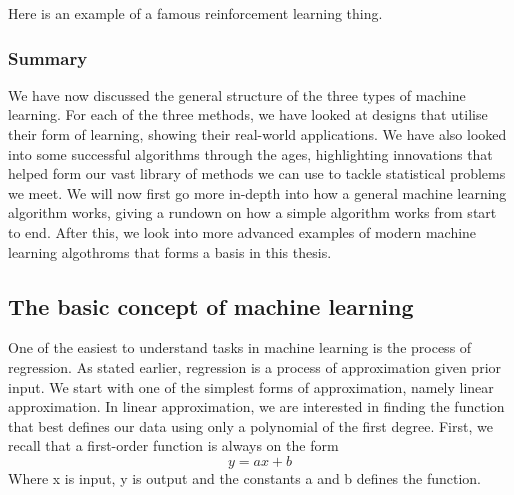 \vspace{5px}

Here is an example of a famous reinforcement learning thing.


\subsubsection{Summary} 

We have now discussed the general structure of the three types of machine learning. For each of the three methods, we have looked at designs that utilise their form of learning, showing their real-world applications.
We have also looked into some successful algorithms through the ages, highlighting innovations that helped form our vast library of methods we can use to tackle statistical problems we meet.
We will now first go more in-depth into how a general machine learning algorithm works, giving a rundown on how a simple algorithm works from start to end.
After this, we look into more advanced examples of modern machine learning algothroms that forms a basis in this thesis.

    
\subsection{The basic concept of machine learning}   
\label{cha:concept}
One of the easiest to understand tasks in machine learning is the process of regression. As stated earlier, regression is a process of approximation given prior input.
We start with one of the simplest forms of approximation, namely linear approximation. In linear approximation, we are interested in finding the function that best defines our data using only a polynomial of the first degree.  First, we recall that a first-order function is always on the form
\begin{equation}
y = ax +b 
\end{equation}
Where x is input, y is output and the constants a and b defines the function.
    

